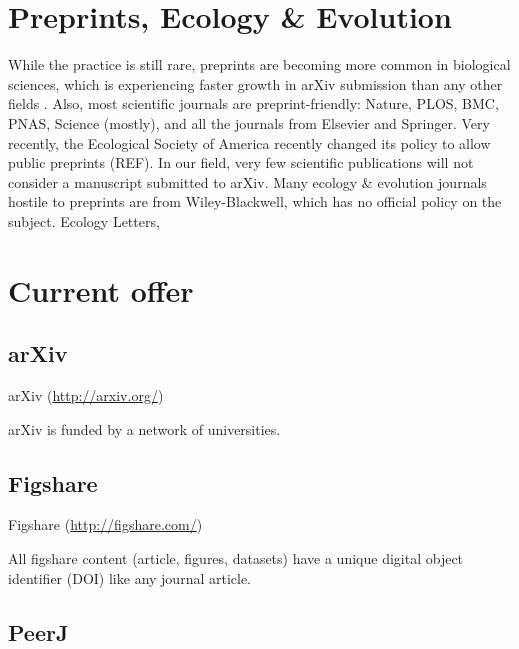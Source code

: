\documentclass[letterpaper,twocolumn,superscriptaddress,showkeys]{revtex4}
\begin{document}


\section{Preprints, Ecology \& Evolution}

While the practice is still rare, preprints are becoming more common in
biological sciences, which is experiencing faster growth in arXiv submission
than any other fields \cite{cal12}. Also, most scientific journals are
preprint-friendly: Nature, PLOS, BMC, PNAS, Science (mostly), and all the
journals from Elsevier and Springer. Very recently, the Ecological Society of
America recently changed its policy to allow public preprints (REF). In our
field, very few scientific publications will not consider a manuscript submitted
to arXiv. Many ecology \& evolution journals hostile to preprints are from
Wiley-Blackwell, which has no official policy on the subject. Ecology Letters,


\section{Current offer}


\subsection{arXiv}

arXiv (\href{http://arxiv.org/}{http://arxiv.org/})

arXiv is funded by a network of universities.

\subsection{Figshare}

Figshare (\href{http://figshare.com/}{http://figshare.com/})

All figshare content (article, figures, datasets) have a unique digital object
identifier (DOI) like any journal article.

\subsection{PeerJ}
\end{document}
